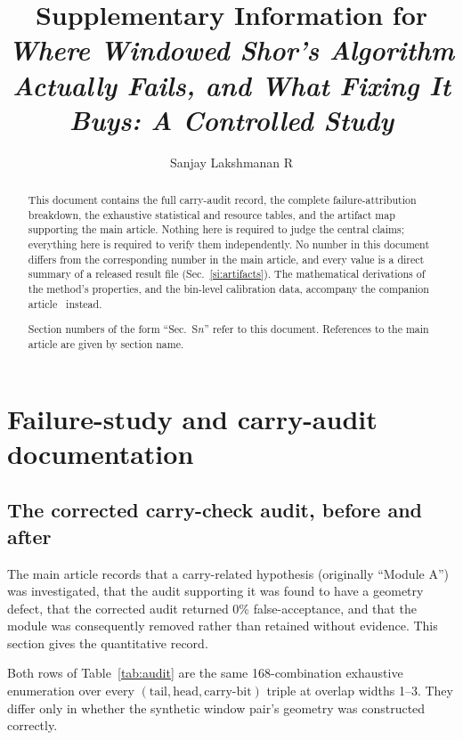 \documentclass[preprint,11pt]{elsarticle}
\begin{document}
\begin{frontmatter}
\title{Supplementary Information for\\
\emph{Where Windowed Shor's Algorithm Actually Fails, and What Fixing
It Buys: A Controlled Study}}
\author[inst1]{Sanjay Lakshmanan R}
\address[inst1]{Department of Computer Science and Engineering,
Amrita Vishwa Vidyapeetham, Chennai, India}

\begin{abstract}
This document contains the full carry-audit record, the complete
failure-attribution breakdown, the exhaustive statistical and resource
tables, and the artifact map supporting the main article. Nothing here is
required to judge the central claims; everything here is required to
verify them independently. No number in this document differs from the
corresponding number in the main article, and every value is a direct
summary of a released result file (Sec.~\ref{si:artifacts}). The
mathematical derivations of the method's properties, and the bin-level
calibration data, accompany the companion article~\cite{methodpaper}
instead.

Section numbers of the form ``Sec.~S$n$'' refer to this document.
References to the main article are given by section name.
\end{abstract}
\end{frontmatter}

\tableofcontents
\vspace{1em}
\section{Failure-study and carry-audit documentation}
\label{si:audit}

\subsection{The corrected carry-check audit, before and after}

The main article records that a carry-related hypothesis (originally
``Module A'') was investigated, that the audit supporting it was found to
have a geometry defect, that the corrected audit returned 0\%
false-acceptance, and that the module was consequently removed rather
than retained without evidence. This section gives the quantitative
record.

Both rows of Table~\ref{tab:audit} are the same 168-combination
exhaustive enumeration over every
$(\mathrm{tail},\mathrm{head},\text{carry-bit})$ triple at overlap widths
1--3. They differ only in whether the synthetic window pair's geometry
was constructed correctly.
\end{document}
